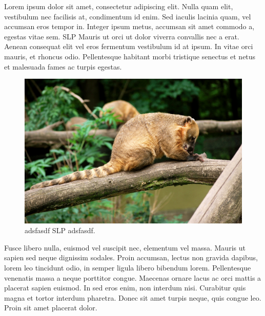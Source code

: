 \documentclass[a4paper,9pt]{scrartcl}
\begin{document}
Lorem ipsum dolor sit amet, consectetur adipiscing elit. Nulla quam elit,
vestibulum nec facilisis at, condimentum id enim. Sed iaculis lacinia quam, vel
accumsan eros tempor in. Integer ipsum metus, accumsan sit amet commodo a,
egestas vitae sem. \Gls{SLP} Mauris ut orci ut dolor viverra convallis nec a
erat. Aenean consequat elit vel eros fermentum vestibulum id at ipsum. In vitae
orci mauris, et rhoncus odio. Pellentesque habitant morbi tristique senectus et
netus et malesuada fames ac turpis egestas.

\begin{figure}[h]
    \centering
    \includegraphics*[width=\linewidth, keepaspectratio]{YourImage.jpg}
    \caption{adsfasdf \gls{SLP} adsfasdf.}
\end{figure}

Fusce libero nulla, euismod vel suscipit nec, elementum vel massa. Mauris ut
sapien sed neque dignissim sodales. Proin accumsan, lectus non gravida dapibus,
lorem leo tincidunt odio, in semper ligula libero bibendum lorem. Pellentesque
venenatis massa a neque porttitor congue. Maecenas ornare lacus ac orci mattis
a placerat sapien euismod. In sed eros enim, non interdum nisi. Curabitur quis
magna et tortor interdum pharetra. Donec sit amet turpis neque, quis congue
leo. Proin sit amet placerat dolor.
\end{document}
